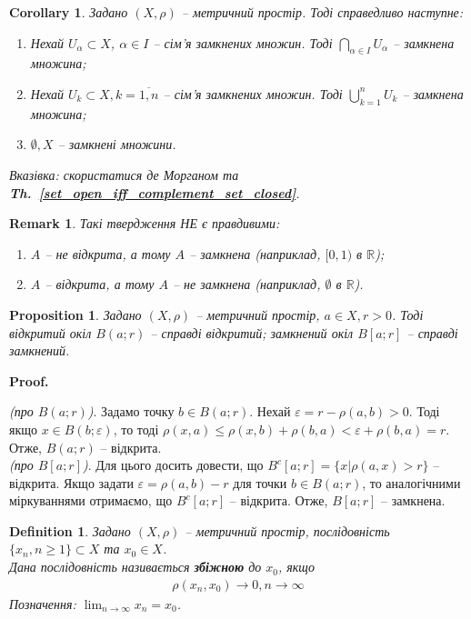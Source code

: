\documentclass[a4paper, 10pt]{article}
\makeatletter
\theoremstyle{theoremdd}
\theoremstyle{theoremdd}
\newtheorem{definition}[theorem]{Definition}
\theoremstyle{theoremdd}
\theoremstyle{theoremdd}
\theoremstyle{theoremdd}
\newtheorem{proposition}[theorem]{Proposition}
\theoremstyle{theoremdd}
\newtheorem{remark}[theorem]{Remark}
\theoremstyle{theoremdd}
\theoremstyle{theoremdd}
\newtheorem{corollary}[theorem]{Corollary}
\newcommand\thref[1]{\textbf{Th.~\ref{#1}}}
\renewenvironment{proof}[1][Proof.\\]{\par
\pushQED{\hfill \qed}%
\normalfont \topsep6\p@\@plus6\p@\relax
\trivlist
\item\relax
{\bfseries
#1\@addpunct{.}}\hspace\labelsep\ignorespaces
}{%
\popQED\endtrivlist\@endpefalse
}
\makeatother
\begin{document}
\begin{corollary}
Задано $(X,\rho)$ -- метричний простір. Тоді справедливо наступне:
\begin{enumerate}[nosep,wide=0pt,label={\arabic*)}]
\item Нехай $U_{\alpha} \subset X$, $\alpha \in I$ -- сім'я замкнених множин. Тоді $\displaystyle \bigcap_{\alpha \in I} U_{\alpha}$ -- замкнена множина;
\item Нехай $U_k \subset X, k = \overline{1,n}$ -- сім'я замкнених множин. Тоді $\displaystyle \bigcup_{k=1}^n U_k$ -- замкнена множина;
\item $\emptyset, X$ -- замкнені множини.
\end{enumerate}
\textit{Вказівка: скористатися де Морганом та \thref{set_open_iff_complement_set_closed}.}
\end{corollary}

\begin{remark} Такі твердження НЕ є правдивими:
\begin{enumerate}[nosep,wide=0pt,label={\arabic*)}]
\item $A$ -- не відкрита, а тому $A$ -- замкнена (наприклад, $[0,1)$ в $\mathbb{R}$);
\item $A$ -- відкрита, а тому $A$ -- не замкнена (наприклад, $\emptyset$ в $\mathbb{R}$).
\end{enumerate}
\end{remark}

\begin{proposition} Задано $(X,\rho)$ -- метричний простір, $a \in X, r > 0$. Тоді відкритий окіл $B(a;r)$ -- справді відкритий; замкнений окіл $B[a;r]$ -- справді замкнений.
\end{proposition}

\begin{proof}
\textit{(про $B(a;r)$)}. Задамо точку $b \in B(a;r)$. Нехай $\varepsilon = r - \rho(a,b) > 0$. Тоді якщо $x \in B(b; \varepsilon)$, то тоді $\rho(x, a) \leq \rho(x, b) + \rho(b, a) < \varepsilon + \rho(b,a) = r$. Отже, $B(a;r)$ -- відкрита.
\bigskip \\
\textit{(про $B[a;r]$)}. Для цього досить довести, що $B^c[a;r] = \{x | \rho(a,x) > r\}$ -- відкрита. Якщо задати $\varepsilon = \rho(a,b) - r$ для точки $b \in B(a;r)$, то аналогічними міркуваннями отримаємо, що $B^c[a;r]$ -- відкрита. Отже, $B[a;r]$ -- замкнена.
\end{proof}

\begin{definition}
Задано $(X,\rho)$ -- метричний простір, послідовність $\{x_n, n \geq 1\} \subset X$ та $x_0 \in X$.\\
Дана послідовність називається \textbf{збіжною} до $x_0$, якщо
\begin{align*}
\rho(x_n, x_0) \to 0, n \to \infty
\end{align*}
Позначення: $\displaystyle\lim_{n \to \infty} x_n = x_0$.
\end{definition}
\end{document}
